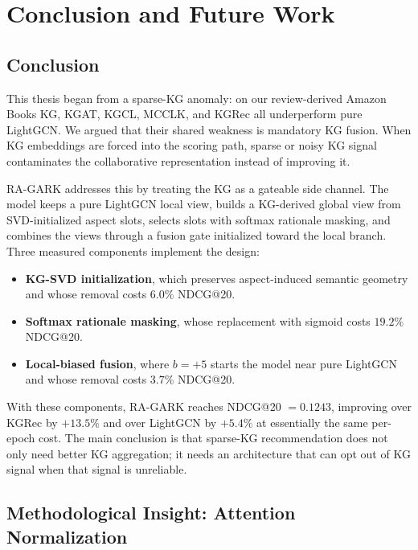 \chapter{Conclusion and Future Work}
\label{ch:conclusion}

\section{Conclusion}
\label{sec:conclude-main}

This thesis began from a sparse-KG anomaly: on our review-derived Amazon Books KG, KGAT, KGCL, MCCLK, and KGRec all underperform pure LightGCN. We argued that their shared weakness is mandatory KG fusion. When KG embeddings are forced into the scoring path, sparse or noisy KG signal contaminates the collaborative representation instead of improving it.

RA-GARK addresses this by treating the KG as a gateable side channel. The model keeps a pure LightGCN local view, builds a KG-derived global view from SVD-initialized aspect slots, selects slots with softmax rationale masking, and combines the views through a fusion gate initialized toward the local branch. Three measured components implement the design:

\begin{itemize}
  \item \textbf{KG-SVD initialization}, which preserves aspect-induced semantic geometry and whose removal costs $6.0\%$ NDCG@20.
  \item \textbf{Softmax rationale masking}, whose replacement with sigmoid costs $19.2\%$ NDCG@20.
  \item \textbf{Local-biased fusion}, where $b=+5$ starts the model near pure LightGCN and whose removal costs $3.7\%$ NDCG@20.
\end{itemize}

With these components, RA-GARK reaches NDCG@20 $=0.1243$, improving over KGRec by $+13.5\%$ and over LightGCN by $+5.4\%$ at essentially the same per-epoch cost. The main conclusion is that sparse-KG recommendation does not only need better KG aggregation; it needs an architecture that can opt out of KG signal when that signal is unreliable.

\section{Methodological Insight: Attention Normalization}
\label{sec:conclude-insight}

